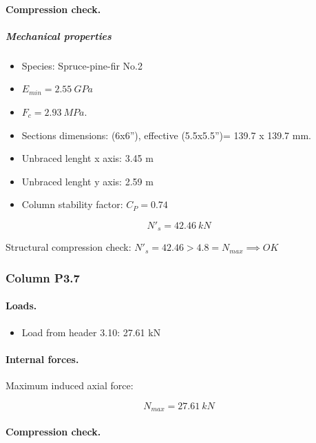 \paragraph{Compression check.}

\subparagraph{Mechanical properties}

\begin{itemize}
\item Species: Spruce-pine-fir No.2
\item $E_{min}= 2.55\ GPa$
\item $F_c= 2.93\ MPa$.
\item Sections dimensions: (6x6''), effective (5.5x5.5'')= 139.7 x 139.7  mm.
\item Unbraced lenght x axis: 3.45 m
\item Unbraced lenght y axis: 2.59 m
\item Column stability factor: $C_P= 0.74$
\end{itemize}

\begin{equation}
  N'_s= 42.46\ kN
\end{equation}

\noindent Structural compression check: $N'_s = 42.46 > 4.8 = N_{max} \implies OK$

\subsubsection{Column P3.7}

\paragraph{Loads.}

\begin{itemize}
\item Load from header 3.10: 27.61 kN
\end{itemize}

\paragraph{Internal forces.}

\noindent Maximum induced axial force:

\begin{equation}
  N_{max}= 27.61\ kN
\end{equation}

\paragraph{Compression check.}

